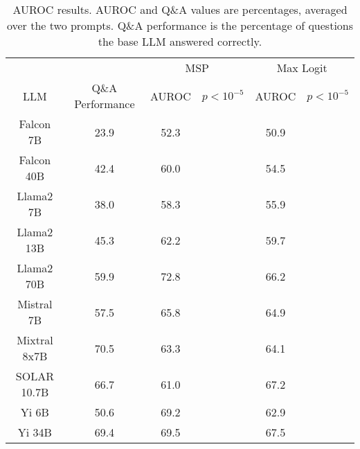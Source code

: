 \begin{table*}
\centering
\begin{tabular}{c|c|c|c|c|c}
& & \multicolumn{2}{c|}{MSP} & \multicolumn{2}{c}{Max Logit} \\ 
LLM & Q\&A Performance & AUROC & $p < 10^{-5}$ & AUROC & $p < 10^{-5}$\\ \hline
Falcon 7B & 23.9 & 52.3 &  & 50.9 & \\
Falcon 40B & 42.4 & 60.0 &  & 54.5 & \\
Llama2 7B & 38.0 & 58.3 &  & 55.9 & \\
Llama2 13B & 45.3 & 62.2 &  & 59.7 & \\
Llama2 70B & 59.9 & 72.8 &  & 66.2 & \\
Mistral 7B & 57.5 & 65.8 &  & 64.9 & \\
Mixtral 8x7B & 70.5 & 63.3 &  & 64.1 & \\
SOLAR 10.7B & 66.7 & 61.0 &  & 67.2 & \\
Yi 6B & 50.6 & 69.2 &  & 62.9 & \\
Yi 34B & 69.4 & 69.5 &  & 67.5 & \\
\hline
\end{tabular}
\caption{AUROC results. AUROC and Q\&A values are percentages, averaged over the two prompts. Q\&A performance is the percentage of questions the base LLM answered correctly.}
\label{tab:auroc}
\end{table*}
